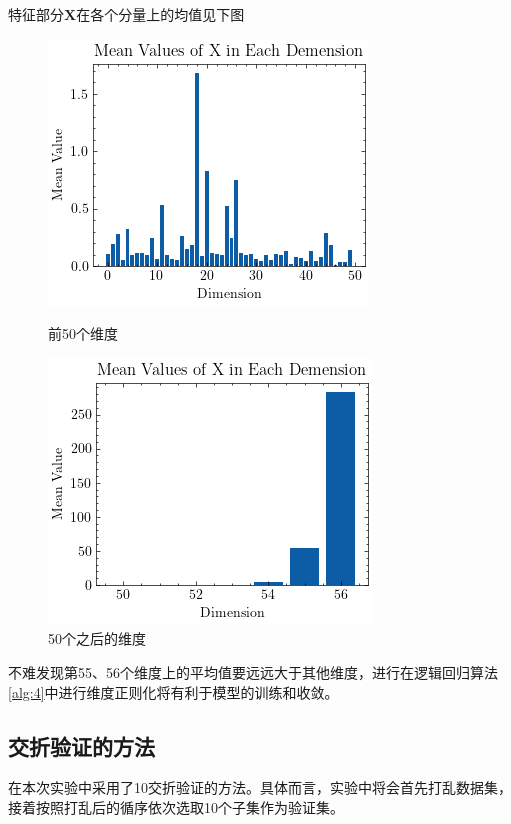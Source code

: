 \documentclass{paper}
\begin{document}
特征部分$\mathbf{X}$在各个分量上的均值见下图
\begin{figure}[H]
    \centering
    \begin{minipage}{0.48\textwidth}
        \centering
        \includegraphics[scale=0.8]{images/value_of_x1.png}
        \caption{前50个维度}
    \end{minipage}
    \begin{minipage}{0.48\textwidth}
        \centering
        \includegraphics[scale=0.8]{images/value_of_x.png}
        \caption{50个之后的维度}
    \end{minipage}
\end{figure}

不难发现第55、56个维度上的平均值要远远大于其他维度，进行在逻辑回归算法\ref{alg:4}中进行维度正则化将有利于模型的训练和收敛。

\subsection{交折验证的方法}

在本次实验中采用了10交折验证的方法。具体而言，实验中将会首先打乱数据集，接着按照打乱后的循序依次选取10个子集作为验证集。
\end{document}
